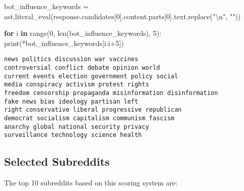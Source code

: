 \documentclass[
  letterpaper,
  DIV=11,
  numbers=noendperiod]{scrartcl}
\newenvironment{Shaded}{\begin{snugshade}}{\end{snugshade}}
\newcommand{\BuiltInTok}[1]{\textcolor[rgb]{0.00,0.23,0.31}{#1}}
\newcommand{\CharTok}[1]{\textcolor[rgb]{0.13,0.47,0.30}{#1}}
\newcommand{\ControlFlowTok}[1]{\textcolor[rgb]{0.00,0.23,0.31}{\textbf{#1}}}
\newcommand{\DecValTok}[1]{\textcolor[rgb]{0.68,0.00,0.00}{#1}}
\newcommand{\KeywordTok}[1]{\textcolor[rgb]{0.00,0.23,0.31}{\textbf{#1}}}
\newcommand{\NormalTok}[1]{\textcolor[rgb]{0.00,0.23,0.31}{#1}}
\newcommand{\OperatorTok}[1]{\textcolor[rgb]{0.37,0.37,0.37}{#1}}
\newcommand{\StringTok}[1]{\textcolor[rgb]{0.13,0.47,0.30}{#1}}
\begin{document}
\begin{Shaded}
\begin{Highlighting}[]
\NormalTok{bot\_influence\_keywords }\OperatorTok{=}\NormalTok{ ast.literal\_eval(response.candidates[}\DecValTok{0}\NormalTok{].content.parts[}\DecValTok{0}\NormalTok{].text.replace(}\StringTok{"}\CharTok{\textbackslash{}n}\StringTok{"}\NormalTok{, }\StringTok{""}\NormalTok{))}

\ControlFlowTok{for}\NormalTok{ i }\KeywordTok{in} \BuiltInTok{range}\NormalTok{(}\DecValTok{0}\NormalTok{, }\BuiltInTok{len}\NormalTok{(bot\_influence\_keywords), }\DecValTok{5}\NormalTok{):}
    \BuiltInTok{print}\NormalTok{(}\OperatorTok{*}\NormalTok{bot\_influence\_keywords[i:i}\OperatorTok{+}\DecValTok{5}\NormalTok{])}
\end{Highlighting}
\end{Shaded}

\begin{verbatim}
news politics discussion war vaccines
controversial conflict debate opinion world
current events election government policy social
media conspiracy activism protest rights
freedom censorship propaganda misinformation disinformation
fake news bias ideology partisan left
right conservative liberal progressive republican
democrat socialism capitalism communism fascism
anarchy global national security privacy
surveillance technology science health
\end{verbatim}

\subsection{Selected Subreddits}\label{sec-subreddits}

The top 10 subreddits based on this scoring system are:
\end{document}
